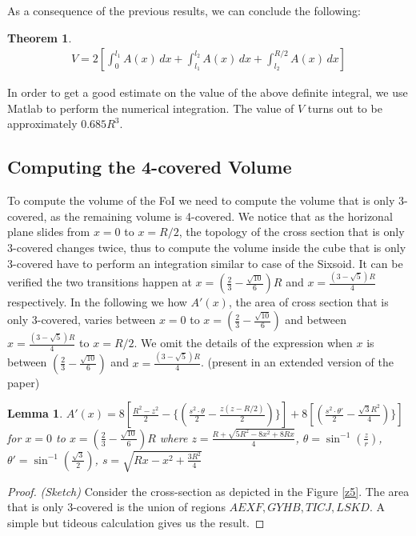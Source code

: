 \documentclass[conference]{IEEEtran}
\newtheorem{lemma}{Lemma}
\newtheorem{theorem}{Theorem}
\begin{document}
As a consequence of the previous results, we can conclude the following:

\begin{theorem}

\begin{eqnarray*}
 V = 2 \left[ \int^{l_1}_{0} A(x)\,dx +  \int^{l_2}_{l_1} A(x)\,dx +  \int^{R/2}_{l_2} A(x)\,dx \right]
\end{eqnarray*}
\end{theorem}

In order to get a good estimate on the value of the above definite integral, we use Matlab to perform the 
numerical integration. The value of $V$ turns out to be approximately $0.685R^3$.

\subsection{Computing the 4-covered Volume}
To compute the volume of the FoI we need to compute the volume 
that is only 3-covered, as the remaining volume is 4-covered. We notice that as the
horizonal plane slides from $x =0$ to $x = R/2$, the topology of the
cross section that is only 3-covered changes twice, thus to compute the volume
inside the cube that is only 3-covered have to perform an integration similar to 
case of the Sixsoid. It can be verified the two transitions happen at $x = (\frac{2}{3} - \frac{\sqrt{10}}{6})R$
and $x = \frac{(3 - \sqrt{5})R}{4}$ respectively. In the following we how $A'(x)$, the area of cross section that is only 3-covered,
varies between $x = 0$ to $x =  (\frac{2}{3}  - \frac{\sqrt{10}}{6})$ and between $x = \frac{(3 - \sqrt{5})R}{4}$ to $x = R/2$.
We omit the details of the expression when $x$ is between $(\frac{2}{3}  - \frac{\sqrt{10}}{6})$ and $x = \frac{(3 - \sqrt{5})R}{4}$.
(present in an extended version of the paper)
 
\begin{lemma}
$A'(x) = 8\left[\frac{R^2 - z^2}{2} - \{ (\frac{s^2 \cdot \theta}{2} - \frac{z(z - R/2)}{2}) \} \right] + 8 \left[(\frac{s^2 \cdot \theta'}{2} - \frac{\sqrt{3}R^2}{4}) \} \right] $ for $x = 0$ to $x = (\frac{2}{3}  - \frac{\sqrt{10}}{6}) R$ where $z =  \frac{R + \sqrt{5R^2 - 8x^2 + 8Rx}}{4} $, $\theta = \sin^{-1}(\frac{z}{r})$, $\theta' = \sin^{-1}(\frac{\sqrt{3}}{2})$, $s =\sqrt{Rx - x^2 + \frac{3R^2}{4}}$
\end{lemma}
\begin{proof}
\emph{(Sketch)} Consider the cross-section as depicted in the Figure \ref{z5}. The area that is only 3-covered is the union of 
regions $AEXF, GYHB, TICJ, LSKD$. A simple but tideous calculation gives us the result.   
\end{proof}
\end{document}
